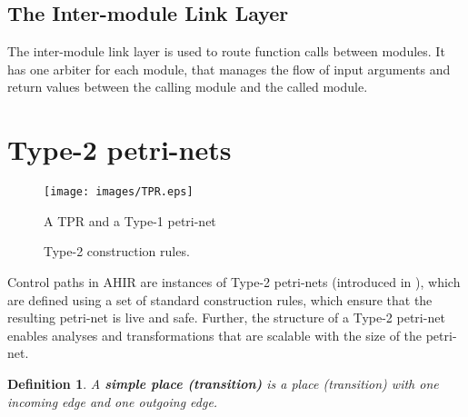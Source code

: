 \documentclass[conference]{IEEEtran}
\newtheorem{definition}{Definition}[section]
\begin{document}
\subsection{The Inter-module Link Layer}

The inter-module link layer is used to route function calls between
modules. It has one arbiter for each module, that manages the flow of
input arguments and return values between the calling module and the
called module. 

\section{Type-2 petri-nets}
\label{section:type-2}

\begin{figure}[!t]
  \centering
  \texttt{[image: images/TPR.eps]}
  \caption{A TPR and a Type-1 petri-net}
  \label{figure:TPR}
\end{figure}

\begin{figure}[!t]
  \centering
  \hspace{0.125in}
  \caption{Type-2 construction rules.}
  \label{figure:Type-2-TPRs}
\end{figure}

Control paths in AHIR are instances of Type-2 petri-nets (introduced
in \cite{ahir_thesis}), which
are defined using a set of standard construction rules, which
ensure that the resulting petri-net is live and safe. 
Further, the structure of a Type-2 petri-net  
enables analyses and transformations that are scalable with
the size of the petri-net.

\begin{definition} A {\bf simple place (transition)} is a place
(transition) with one incoming edge and one outgoing edge.
\end{definition}
\end{document}
